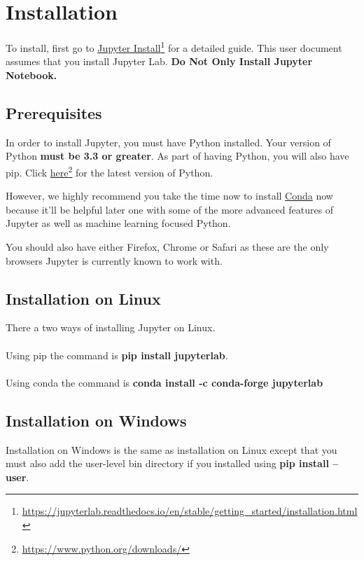 \documentclass[pdftex,12pt]{artikel3}
\begin{document}
\section{Installation}

To install, first go to \href{https://jupyterlab.readthedocs.io/en/stable/getting_started/installation.html}{Jupyter Install}\footnote{\url{ https://jupyterlab.readthedocs.io/en/stable/getting_started/installation.html}} for a detailed guide. This user document assumes that you install Jupyter Lab. \textbf{Do Not Only Install Jupyter Notebook. }

\subsection{Prerequisites}
In order to install Jupyter, you must have Python installed. Your version of Python \textbf{must be 3.3 or greater}. As part of having Python, you will also have pip. Click \href{https://www.python.org/downloads/}{here}\footnote{\url{ https://www.python.org/downloads/}} for the latest version of Python.


However, we highly recommend you take the time now to install \href{https://docs.conda.io/projects/conda/en/latest/user-guide/install/}{Conda} now because it'll be helpful later one with some of the more advanced features of Jupyter as well as machine learning focused Python.


You should also have either Firefox, Chrome or Safari as these are the only browsers Jupyter is currently known to work with.

\subsection{Installation on Linux}
There a two ways of installing Jupyter on Linux.\\
\\
Using pip the command is \textbf{pip install jupyterlab}.\\
\\
Using conda the command is \textbf{conda install -c conda-forge jupyterlab}

\subsection{Installation on Windows}
Installation on Windows is the same as installation on Linux except that you must also add the user-level bin directory if you installed using \textbf{pip install --user}.
\end{document}

